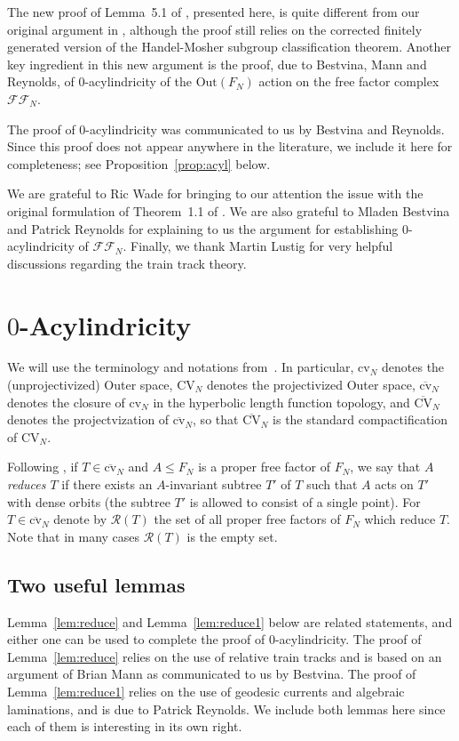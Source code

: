 \documentclass[10pt]{amsart}
\newcommand\<{\langle}
\renewcommand\>{\rangle}
\newcommand{\Out}{\mbox{Out}}
\newcommand{\cvn}{\mbox{cv}_N}
\newcommand{\cvnbar}{\overline{\mbox{cv}}_N}
\newcommand{\CVN}{\mbox{CV}_N}
\newcommand{\CVNbar}{\overline{\mbox{CV}}_N}
\theoremstyle{definition}
\begin{document}
The new proof of Lemma~5.1 of \cite{CFKM}, presented here,
is quite different from our original argument in \cite{CFKM}, although the proof
still relies on the corrected finitely generated version of the
Handel-Mosher subgroup classification theorem. Another key
ingredient in this new argument is the proof, due to Bestvina, Mann
and Reynolds, of 0-acylindricity of the $\Out(F_N)$ action on the
free factor complex $\mathcal{FF}_N$.

The proof of 0-acylindricity was communicated to us
by Bestvina and Reynolds. Since this proof does not appear
anywhere in the literature, we include it here for completeness; see
Proposition~\ref{prop:acyl} below.

We are grateful to Ric Wade for bringing to our attention the issue
with the original formulation of Theorem~1.1 of \cite{HM}. We are also
grateful to Mladen Bestvina and Patrick Reynolds for explaining to us
the argument for establishing 0-acylindricity of
$\mathcal{FF}_N$. Finally, we thank Martin Lustig for very helpful
discussions regarding the train track theory.


\section{$0$-Acylindricity}


We will use the terminology and notations from~\cite{CFKM}. In
particular, $\cvn$ denotes the (unprojectivized) Outer space, $\CVN$
denotes the projectivized Outer space, $\cvnbar$ denotes the closure
of $\cvn$ in the hyperbolic length function topology, and $\CVNbar$ denotes the projectvization of $\cvnbar$, so that $\CVNbar$ is the standard compactification of $\CVN$.


Following \cite{Rey,BR}, if $T\in\cvnbar$ and $A\le F_N$ is a proper free factor of $F_N$, we say that $A$ \emph{reduces $T$} if there exists an $A$-invariant subtree $T'$ of $T$ such that $A$ acts on $T'$ with dense orbits (the subtree $T'$ is allowed to consist of a single point). For $T\in \cvnbar$ denote by $\mathcal R(T)$ the set of all proper free factors of $F_N$ which reduce $T$.  Note that in many cases $\mathcal R(T)$ is the empty set.


\subsection{Two useful lemmas}

Lemma~\ref{lem:reduce} and Lemma~\ref{lem:reduce1} below are
related statements, and either one  can be used to complete the
proof of 0-acylindricity. The proof of Lemma~\ref{lem:reduce} relies
on the use of relative train tracks and is based on an argument of
Brian Mann as communicated to us by Bestvina. The proof of
Lemma~\ref{lem:reduce1} relies on the use of geodesic currents and
algebraic laminations, and is due to Patrick Reynolds. We include both
lemmas here since each of them is interesting in its own right.
\end{document}
